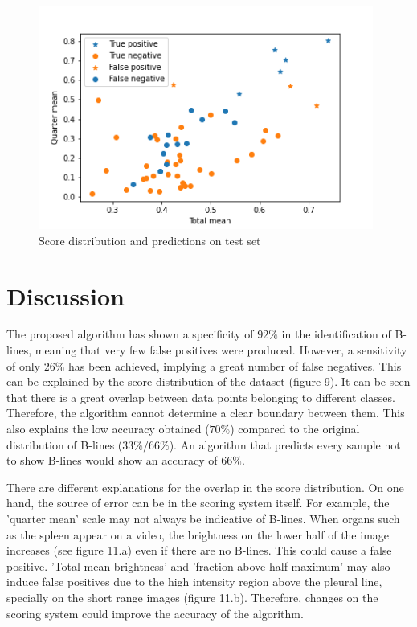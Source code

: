 \documentclass[12pt]{article} %
\begin{document}
	\begin{figure}[h]
	\centering
	\includegraphics[width=11cm]{figuras/discussion.png}
	\caption{Score distribution and predictions on test set}
	\end{figure}	

\section{Discussion}

	The proposed algorithm has shown a specificity of $92 \%$ in the identification of B-lines, meaning that very few false positives were produced. However, a sensitivity of only $26 \%$ has been achieved, implying a great number of false negatives.  This can be explained by the score distribution of the dataset (figure 9). It can be seen that there is a great overlap between data points belonging to different classes. Therefore, the algorithm cannot determine a clear boundary between them. This also explains the low accuracy obtained ($70\%$) compared to the original distribution of B-lines ($ 33\% / 66\%$). An algorithm that predicts every sample not to show B-lines would show an accuracy of $66\%$.
	
	
	There are different explanations for the overlap in the score distribution. On one hand, the source of error can be in the scoring system itself. For example, the 'quarter mean' scale may not always be indicative of B-lines. When organs such as the spleen appear on a video, the brightness on the lower half of the image increases (see figure 11.a) even if there are no B-lines. This could cause a false positive. 'Total mean brightness' and 'fraction above half maximum' may also induce false positives due to the high intensity region above the pleural line, specially on the short range images (figure 11.b). Therefore, changes on the scoring system could improve the accuracy of the algorithm.
	
\end{document}
